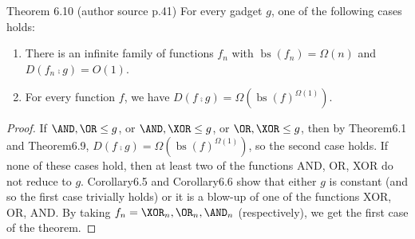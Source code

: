 \begin{originalresult}{Theorem 6.10 (author source p.41)}
For every gadget $g$, one of the following cases holds:
\begin{enumerate}
\item[(i)] There is an infinite family of functions $f_n$ with $\operatorname{bs}(f_n)=\Omega(n)$ and $D(f_n\comp g)=O(1)$.
\item[(ii)] For every function $f$, we have $D(f\comp g)=\Omega(\operatorname{bs}(f)^{\Omega(1)})$.
\end{enumerate}
\end{originalresult}
\begin{proof}
If $\AND,\OR\le g$, or $\AND,\XOR\le g$, or $\OR,\XOR\le g$, then by Theorem6.1 and Theorem6.9, $D(f\comp g)=\Omega(\operatorname{bs}(f)^{\Omega(1)})$, so the second case holds.
If none of these cases hold, then at least two of the functions AND, OR, XOR do not reduce to $g$. Corollary6.5 and Corollary6.6 show that either $g$ is constant (and so the first case trivially holds) or it is a blow-up of one of the functions XOR, OR, AND. By taking $f_n=\XOR_n,\OR_n,\AND_n$ (respectively), we get the first case of the theorem.
\end{proof}
